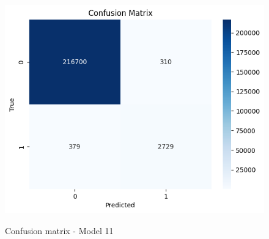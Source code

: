 \documentclass[12pt]{article}
\begin{document}
\begin{figure}
\break
\begin{minipage}[c]{0.45\linewidth}
\includegraphics[width=1\textwidth]{Confusion_matrix_Model 11.png}\\
\caption{Confusion matrix - Model 11}
\end{minipage}
\begin{minipage}[c]{0.45\linewidth}

\end{minipage}
\end{figure}
\end{document}
